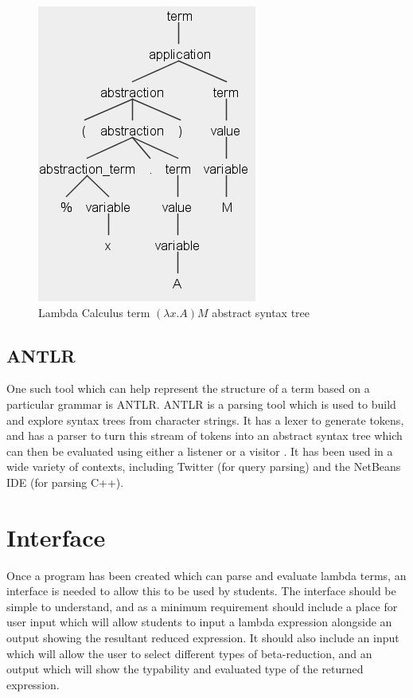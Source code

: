\documentclass[a4paper,11pt]{report}
\begin{document}
\begin{figure}[p]
	\centering
	\includegraphics[scale=0.75]{images/abstract_syntax_tree}
	\caption{Lambda Calculus term $(\lambda x.A)M$ abstract syntax tree}
	\label{abstract_syntax_tree}
\end{figure}


\subsection{ANTLR}

One such tool which can help represent the structure of a term based on a particular grammar is ANTLR. ANTLR is a parsing tool which is used to build and explore syntax trees from character strings. It has a lexer to generate tokens, and has a parser to turn this stream of tokens into an abstract syntax tree which can then be evaluated using either a listener or a visitor \cite{Parr2012}. It has been used in a wide variety of contexts, including Twitter (for query parsing) and the NetBeans IDE (for parsing C++). %

\section{Interface}

Once a program has been created which can parse and evaluate lambda terms, an interface is needed to allow this to be used by students. The interface should be simple to understand, and as a minimum requirement should include a place for user input which will allow students to input a lambda expression alongside an output showing the resultant reduced expression. It should also include an input which will allow the user to select different types of beta-reduction, and an output which will show the typability and evaluated type of the returned expression.
\end{document}
